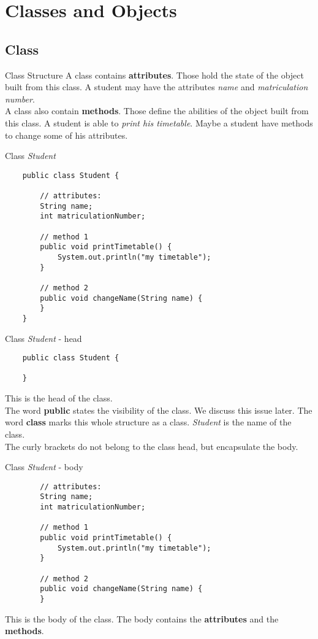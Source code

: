 \section{Classes and Objects}
\subsection{Class}
\begin{frame}{Class Structure}
	A class contains \textbf{attributes}. Those hold the state of the object built from this class. 
	A student may have the attributes \emph{name} and \emph{matriculation number}. \\
	\vspace{1em}
	A class also contain \textbf{methods}. Those define the abilities of the object built from this class.
	A student is able to \emph{print his timetable}. Maybe a student have methods to change some of his attributes.
\end{frame}

\begin{frame}[fragile]{Class \emph{Student}}
	\begin{lstlisting}
	public class Student {
	
	    // attributes:
	    String name;
	    int matriculationNumber;	
	
	    // method 1
	    public void printTimetable() {
	        System.out.println("my timetable");
	    }
	    
	    // method 2
	    public void changeName(String name) {
	    }
	}
	\end{lstlisting}
\end{frame}

\begin{frame}[fragile]{Class \emph{Student} - head}
	\begin{lstlisting}
	public class Student {
	
	}
	\end{lstlisting}
	This is the head of the class. \\
	The word \textbf{public} states the visibility of the class.
	We discuss this issue later. The word \textbf{class} marks this whole structure as a class.
	\emph{Student} is the name of the class. \\
	The curly brackets do not belong to the class head, but encapsulate the body.
\end{frame}

\begin{frame}[fragile]{Class \emph{Student} - body}
	\begin{lstlisting}
	    // attributes:
	    String name;
	    int matriculationNumber;	
	
	    // method 1
	    public void printTimetable() {
	        System.out.println("my timetable");
	    }
	    
	    // method 2
	    public void changeName(String name) {
	    }
	\end{lstlisting}
	This is the body of the class. The body contains the \textbf{attributes} and the \textbf{methods}.
\end{frame}

